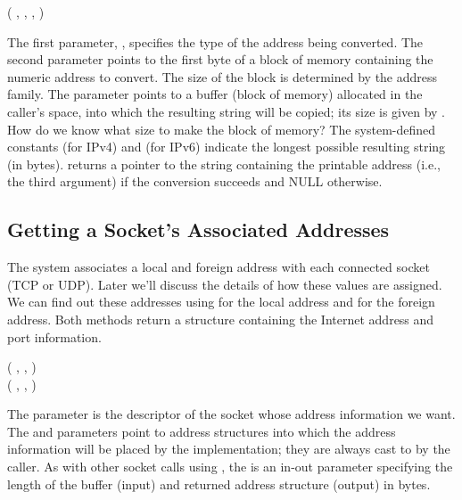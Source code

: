 \begin{inlinefcn}
( , 
, , 
)
\end{inlinefcn}

\noindent The first parameter, , specifies the
type of the address being converted. The second parameter
 points to the first byte  of a block of memory containing
the numeric address to convert.  The size of the block
is determined by the address family.  The  parameter points
to a buffer (block of memory) allocated in the caller's space, into which the
resulting string will be copied; its size is given by
.
How do we know what size to make the block of memory?
The system-defined constants
 (for IPv4) and
 (for IPv6) indicate the longest possible
resulting string (in bytes).  
returns a pointer to the string containing the printable address
(i.e., the third argument) if the conversion succeeds and NULL otherwise.

\subsection{Getting a Socket's Associated Addresses}
\label{sect:getpeername}
The system associates a local and foreign address with each
connected socket (TCP or UDP).
Later we'll discuss the details of how these values are assigned.
We can find out these addresses using 
for the local address and  for the foreign
address.  Both
methods return a  structure containing the Internet address
and port information.

\begin{inlinefcn}
 ( ,
, 
)\\
 ( ,
, 
)
\end{inlinefcn}

The  parameter is the descriptor of the socket whose
address information we want. The   and
 parameters point to address structures
into which the address information will be placed by the
implementation; they are always cast to
 by the caller.
  As
with other socket calls using , the  is an
in-out parameter specifying the length of the buffer (input) and
returned address structure (output) in bytes.

